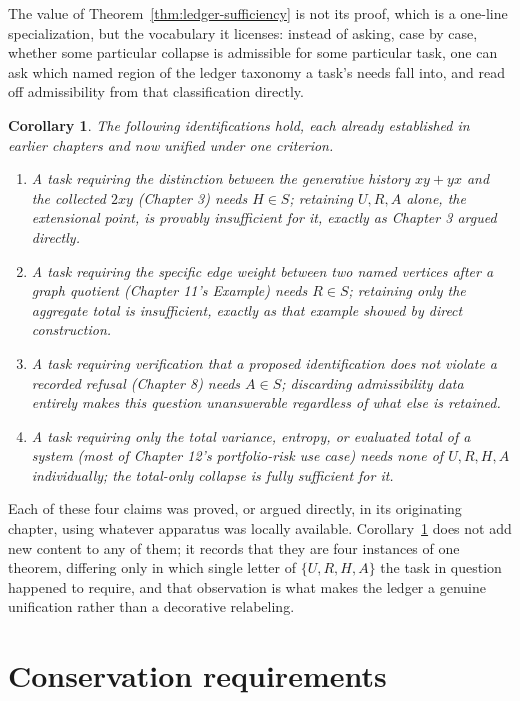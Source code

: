 \documentclass[11pt]{book}
\newtheorem{corollary}[theorem]{Corollary}
\begin{document}
The value of Theorem~\ref{thm:ledger-sufficiency} is not its proof, which is a one-line specialization, but the vocabulary it licenses: instead of asking, case by case, whether some particular collapse is admissible for some particular task, one can ask which named region of the ledger taxonomy a task's needs fall into, and read off admissibility from that classification directly.

\begin{corollary}
\label{cor:ledger-examples}
The following identifications hold, each already established in earlier chapters and now unified under one criterion.
\begin{enumerate}
\item A task requiring the distinction between the generative history $xy+yx$ and the collected $2xy$ (Chapter 3) needs $H\in S$; retaining $U,R,A$ alone, the extensional point, is provably insufficient for it, exactly as Chapter 3 argued directly.
\item A task requiring the specific edge weight between two named vertices after a graph quotient (Chapter 11's Example) needs $R\in S$; retaining only the aggregate total is insufficient, exactly as that example showed by direct construction.
\item A task requiring verification that a proposed identification does not violate a recorded refusal (Chapter 8) needs $A\in S$; discarding admissibility data entirely makes this question unanswerable regardless of what else is retained.
\item A task requiring only the total variance, entropy, or evaluated total of a system (most of Chapter 12's portfolio-risk use case) needs none of $U,R,H,A$ individually; the total-only collapse is fully sufficient for it.
\end{enumerate}
\end{corollary}

Each of these four claims was proved, or argued directly, in its originating chapter, using whatever apparatus was locally available. Corollary~\ref{cor:ledger-examples} does not add new content to any of them; it records that they are four instances of one theorem, differing only in which single letter of $\{U,R,H,A\}$ the task in question happened to require, and that observation is what makes the ledger a genuine unification rather than a decorative relabeling.

\section{Conservation requirements}
\end{document}
